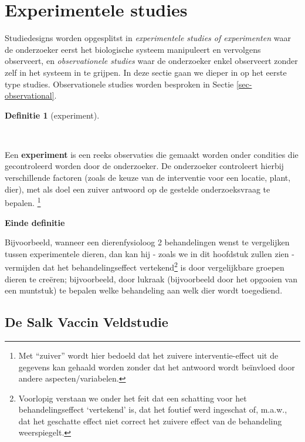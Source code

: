 \documentclass[
  dutch,
  letterpaper,
  12pt]{book}
\theoremstyle{definition}
\theoremstyle{definition}
\newtheorem{definition}{Definitie}[chapter]
\theoremstyle{definition}
\theoremstyle{remark}
\begin{document}
\section{Experimentele studies}\label{experimentele-studies}

Studiedesigns worden opgesplitst in \emph{experimentele studies of
experimenten} waar de onderzoeker eerst het biologische systeem
manipuleert en vervolgens observeert, en \emph{observationele studies}
waar de onderzoeker enkel observeert zonder zelf in het systeem in te
grijpen. In deze sectie gaan we dieper in op het eerste type studies.
Observationele studies worden besproken in Sectie
\ref{sec-observational}.

\begin{definition}[experiment]\protect\hypertarget{def-experiment}{}\label{def-experiment}

~

\end{definition}

Een \textbf{experiment} is een reeks observaties die gemaakt worden
onder condities die gecontroleerd worden door de onderzoeker. De
onderzoeker controleert hierbij verschillende factoren (zoals de keuze
van de interventie voor een locatie, plant, dier), met als doel een
zuiver antwoord op de gestelde onderzoeksvraag te bepalen. \footnote{Met
  ``zuiver'' wordt hier bedoeld dat het zuivere interventie-effect uit
  de gegevens kan gehaald worden zonder dat het antwoord wordt beïnvloed
  door andere aspecten/variabelen.}

\textbf{Einde definitie}

Bijvoorbeeld, wanneer een dierenfysioloog 2 behandelingen wenst te
vergelijken tussen experimentele dieren, dan kan hij - zoals we in dit
hoofdstuk zullen zien - vermijden dat het behandelingseffect
vertekend\footnote{ Voorlopig verstaan we onder het feit dat een
  schatting voor het behandelingseffect `vertekend' is, dat het foutief
  werd ingeschat of, m.a.w., dat het geschatte effect niet correct het
  zuivere effect van de behandeling weerspiegelt.} is door vergelijkbare
groepen dieren te creëren; bijvoorbeeld, door lukraak (bijvoorbeeld door
het opgooien van een muntstuk) te bepalen welke behandeling aan welk
dier wordt toegediend.

\subsection{De Salk Vaccin Veldstudie}\label{de-salk-vaccin-veldstudie}
\end{document}
